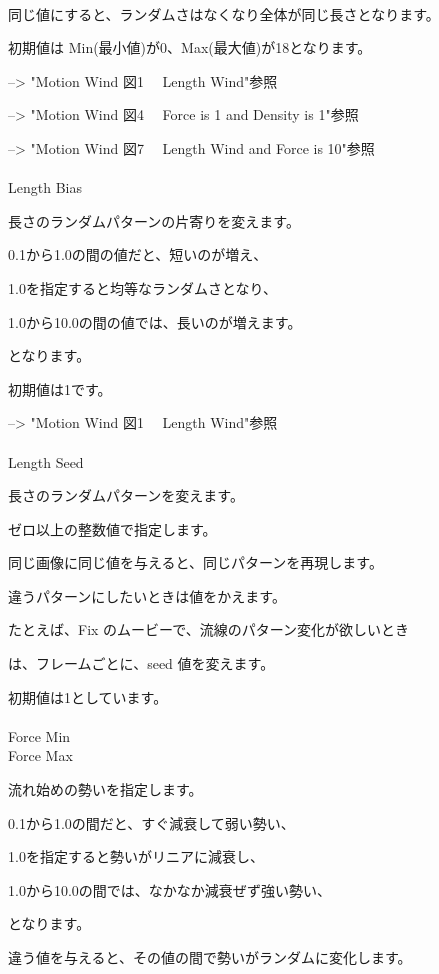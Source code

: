 \documentclass[a4paper,12pt]{article}
\begin{document}
\newpage

\thispagestyle{empty}

\ \vspace{-0.2em}
\par
同じ値にすると、ランダムさはなくなり全体が同じ長さとなります。\par
初期値は Min(最小値)が0、Max(最大値)が18となります。\par
--> "Motion Wind 図1 \ \ Length Wind"参照\par
--> "Motion Wind 図4 \ \ Force is 1 and Density is 1"参照\par
--> "Motion Wind 図7 \ \ Length Wind and Force is 10"参照\\
\\
Length Bias\par
長さのランダムパターンの片寄りを変えます。\par
0.1から1.0の間の値だと、短いのが増え、\par
1.0を指定すると均等なランダムさとなり、\par
1.0から10.0の間の値では、長いのが増えます。\par
となります。\par
初期値は1です。\par
--> "Motion Wind 図1 \ \ Length Wind"参照\\
\\
Length Seed\par
長さのランダムパターンを変えます。\par
ゼロ以上の整数値で指定します。\par
同じ画像に同じ値を与えると、同じパターンを再現します。\par
違うパターンにしたいときは値をかえます。\par
たとえば、Fix のムービーで、流線のパターン変化が欲しいとき\par
は、フレームごとに、seed 値を変えます。\par
初期値は1としています。\\
\\
Force Min\\
Force Max\par
流れ始めの勢いを指定します。\par
0.1から1.0の間だと、すぐ減衰して弱い勢い、\par
1.0を指定すると勢いがリニアに減衰し、\par
1.0から10.0の間では、なかなか減衰ぜず強い勢い、\par
となります。\par
違う値を与えると、その値の間で勢いがランダムに変化します。\par
\end{document}

